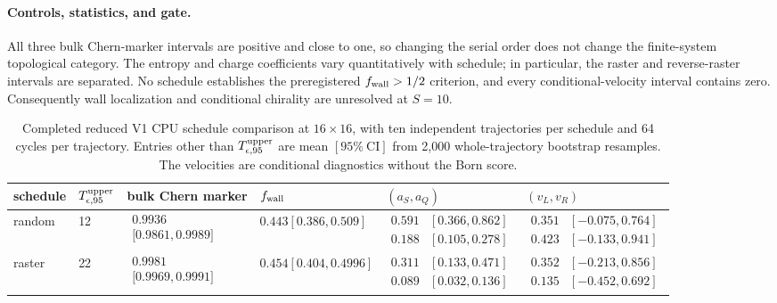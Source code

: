 \documentclass[aps,prx,twocolumn,floatfix,nofootinbib,superscriptaddress,longbibliography]{revtex4-2}
\newcommand{\campaignTableSetup}{%
  \footnotesize
  \setlength{\tabcolsep}{4pt}%
  \renewcommand{\arraystretch}{1.12}%
}
\begin{document}
\paragraph*{Controls, statistics, and gate.}
All three bulk Chern-marker intervals are positive and close to one, so changing the serial
order does not change the finite-system topological category.  The entropy and charge
coefficients vary quantitatively with schedule; in particular, the raster and
reverse-raster intervals are separated.  No schedule establishes the preregistered
$f_{\rm wall}>1/2$ criterion, and every conditional-velocity interval contains zero.
Consequently wall localization and conditional chirality are unresolved at $S=10$.

\begin{table}[t]
\campaignTableSetup
\caption{Completed reduced V1 CPU schedule comparison at $16\times16$, with ten
independent trajectories per schedule and 64 cycles per trajectory.  Entries other than
$T_{\epsilon,95}^{\rm upper}$ are mean $[95\%\ \mathrm{CI}]$ from 2,000 whole-trajectory
bootstrap resamples.  The velocities are conditional diagnostics without the Born score.}
\label{tab:V1-reduced}
\begin{tabularx}{\textwidth}{@{}L{0.70}L{0.70}L{1.00}L{1.00}L{1.25}L{1.35}@{}}
\toprule
schedule & $T_{\epsilon,95}^{\rm upper}$ & bulk Chern marker & $f_{\rm wall}$
& $(a_S,a_Q)$ & $(v_L,v_R)$ \\
\midrule
random & 12
& $\begin{aligned}0.9936\\\lbrack0.9861,0.9989\rbrack\end{aligned}$
& $0.443[0.386,0.509]$
& $\begin{aligned}0.591&[0.366,0.862]\\0.188&[0.105,0.278]\end{aligned}$
& $\begin{aligned}0.351&[-0.075,0.764]\\0.423&[-0.133,0.941]\end{aligned}$ \\
raster & 22
& $\begin{aligned}0.9981\\\lbrack0.9969,0.9991\rbrack\end{aligned}$
& $0.454[0.404,0.4996]$
& $\begin{aligned}0.311&[0.133,0.471]\\0.089&[0.032,0.136]\end{aligned}$
& $\begin{aligned}0.352&[-0.213,0.856]\\0.135&[-0.452,0.692]\end{aligned}$ \\

\end{tabularx}
\end{table}
\end{document}
